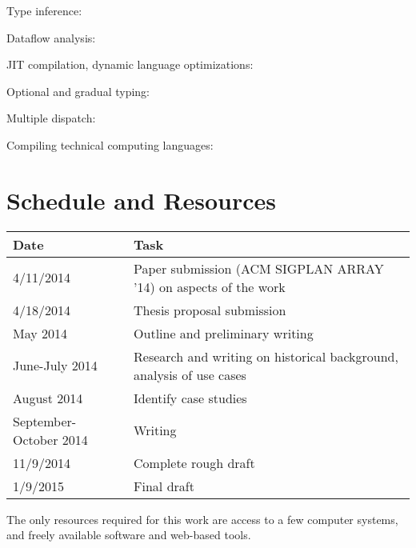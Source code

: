 \documentclass[12pt]{article}
\begin{document}
Type inference: \cite{kaplanullman, MLtypeinf, TICL,
pticl, nimble, taggingopt, typeinfjavascript}

Dataflow analysis: \cite{graphfree, abstractinterp, widening}

JIT compilation, dynamic language optimizations: \cite{futamura, pypyjit,
selflang, tracingjit, tracingjit2, druby,
profileguided, rubydust, lispcrit}

Optional and gradual typing: \cite{typedscheme, dylantypes, dyntype,
gradualobjects}

Multiple dispatch: \cite{closoverview, closspec, cecil, dieselspec, dylanlang}

Compiling technical computing languages: \cite{telescoping, telescopingvectorization,
slicehoisting, falcon, Rose:1999tt, Li:2013mf, matlabspecializer, majic}


\section{Schedule and Resources}

\begin{tabular}{|l|p{11cm}|}
\hline
\textbf{Date} & \textbf{Task} \\
\hline \hline
4/11/2014 & Paper submission (ACM SIGPLAN ARRAY '14) on aspects of the work \\
\hline
4/18/2014 & Thesis proposal submission \\
\hline
May 2014 & Outline and preliminary writing \\
\hline
June-July 2014 & Research and writing on historical background, analysis of use
cases \\
\hline
August 2014 & Identify case studies \\
\hline
September-October 2014 & Writing \\
\hline
11/9/2014 & Complete rough draft \\
\hline
1/9/2015 & Final draft \\
\hline
\end{tabular}

The only resources required for this work are access to a few computer systems,
and freely available software and web-based tools.

\newpage



\end{document}
